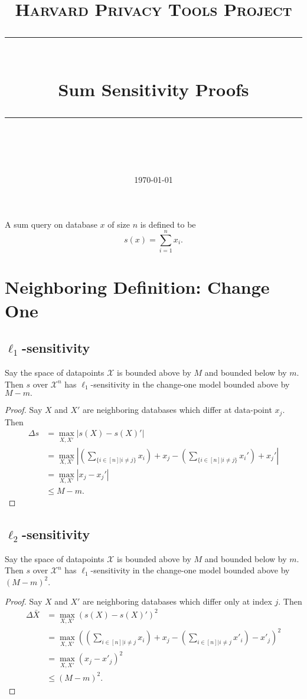 \documentclass[11pt]{scrartcl} %
\title{
	\normalfont\normalsize
	\textsc{Harvard Privacy Tools Project}\\ %
	\vspace{25pt} %
	\rule{\linewidth}{0.5pt}\\ %
	\vspace{20pt} %
	{\huge Sum Sensitivity Proofs}\\ %
	\vspace{12pt} %
	\rule{\linewidth}{2pt}\\ %
	\vspace{12pt} %
}
\date{\normalsize\today} %
\begin{document}
\maketitle

\begin{definition}
A sum query on database $x$ of size $n$ is defined to be
$$s(x) = \sum_{i=1}^n x_i.$$
\end{definition}

\section{Neighboring Definition: Change One}

\subsection{$\ell_1$-sensitivity}
\begin{theorem}
Say the space of datapoints $\mathcal{X}$ is bounded above by $M$ and bounded below by $m$. Then $s$ over $\mathcal{X}^n$ has $\ell_1$-sensitivity in the change-one model bounded above by $M-m.$
\end{theorem}

\begin{proof}
Say $X$ and $X'$ are neighboring databases which differ at data-point $x_j$. Then
\begin{align*}
\Delta{s} &= \max_{X,X'} \left\vert s(X) - s(X)' \right\vert \\
	&=  \max_{X,X'} \left\vert \left(\sum_{\{ i \in [n] \vert i \ne j\}} x_i\right) + x_j  - \left(\sum_{\{ i \in [n] \vert i \ne j\}} x_i'\right) + x_j'  \right\vert \\
	&= \max_{X,X'} \left\vert x_j - x_j' \right\vert \\
	&\le M-m.
\end{align*}
\end{proof}

\subsection{$\ell_2$-sensitivity}
\begin{theorem}
	Say the space of datapoints $\mathcal{X}$ is bounded above by $M$ and bounded below by $m$.
	Then $s$ over $\mathcal{X}^n$ has $\ell_1$-sensitivity in the change-one model bounded above by $(M-m)^2.$
\end{theorem}

\begin{proof}
	Say $X$ and $X'$ are neighboring databases which differ only at index $j$. Then
	\begin{align*}
		\Delta{\bar{X}} &= \max_{X,X'} (s(X) - s(X)')^2 \\
						&= \max_{X,X'} \left(
								\left( \sum_{i \in [n] | i \neq j} x_i \right) + x_j -
								\left( \sum_{i \in [n] | i \neq j} x'_i \right) - x'_j
							\right)^2 \\
						&= \max_{X,X'} (x_j - x'_j)^2 \\
						&\leq (M-m)^2.
	\end{align*}
\end{proof}
\end{document}
